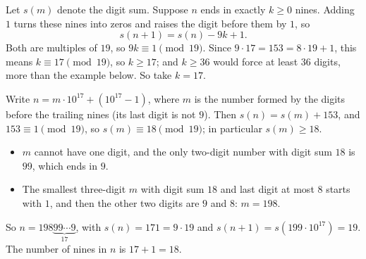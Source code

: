 Let $s(m)$ denote the digit sum. Suppose $n$ ends in exactly $k\ge0$ nines. Adding $1$ turns these nines into zeros and raises the digit before them by $1$, so
\[s(n+1)=s(n)-9k+1.\]
Both are multiples of $19$, so $9k\equiv1\pmod{19}$. Since $9\cdot17=153=8\cdot19+1$, this means $k\equiv17\pmod{19}$, so $k\ge17$; and $k\ge36$ would force at least $36$ digits, more than the example below. So take $k=17$.

Write $n=m\cdot10^{17}+\left(10^{17}-1\right)$, where $m$ is the number formed by the digits before the trailing nines (its last digit is not $9$). Then $s(n)=s(m)+153$, and $153\equiv1\pmod{19}$, so $s(m)\equiv18\pmod{19}$; in particular $s(m)\ge18$.
\begin{itemize}
\item $m$ cannot have one digit, and the only two-digit number with digit sum $18$ is $99$, which ends in $9$.
\item The smallest three-digit $m$ with digit sum $18$ and last digit at most $8$ starts with $1$, and then the other two digits are $9$ and $8$: $m=198$.
\end{itemize}
So $n=198\underbrace{99\cdots9}_{17}$, with $s(n)=171=9\cdot19$ and $s(n+1)=s\left(199\cdot10^{17}\right)=19$. The number of nines in $n$ is $17+1=\boxed{18}$.
